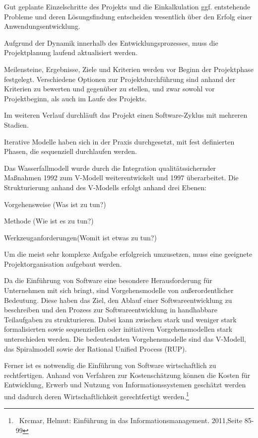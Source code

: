 \documentclass{article}
\begin{document}
Gut geplante Einzelschritte des Projekts und die Einkalkulation ggf. entstehende Probleme und deren Lösungsfindung
entscheiden wesentlich über den Erfolg einer Anwendungsentwicklung.

Aufgrund der Dynamik innerhalb des Entwicklungsprozesses, muss die Projektplanung laufend aktualisiert werden.

Meilensteine, Ergebnisse, Ziele und Kriterien werden vor Beginn der Projektphase festgelegt. Verschiedene Optionen zur
Projektdurchführung sind anhand der Kriterien zu bewerten und gegenüber zu stellen, und zwar sowohl vor Projektbeginn,
als auch im Laufe des Projekts.

Im weiteren Verlauf durchläuft das Projekt einen Software-Zyklus mit mehreren Stadien. 

Iterative Modelle haben sich in der Praxis durchgesetzt, mit fest definierten Phasen, die sequenziell durchlaufen
werden.

Das Wasserfallmodell wurde durch die Integration qualitätssichernder Maßnahmen 1992 zum V-Modell weiterentwickelt und
1997 überarbeitet. Die Strukturierung anhand des V-Modells erfolgt anhand drei Ebenen:

Vorgehensweise (Was ist zu tun?)

Methode (Wie ist es zu tun?)

Werkzeuganforderungen(Womit ist etwas zu tun?)


\bigskip

Um die meist sehr komplexe Aufgabe erfolgreich umzusetzen, muss eine geeignete Projektorganisation aufgebaut werden.


\bigskip

Da die Einführung von Software eine besondere Herausforderung für Unternehmen mit sich bringt, sind Vorgehensmodelle von
außerordentlicher Bedeutung. Diese haben das Ziel, den Ablauf einer Softwareentwicklung zu beschreiben und den Prozess
zur Softwareentwicklung in handhabbare Teilaufgaben zu strukturieren. Dabei kann zwischen stark und weniger stark
formalisierten sowie sequenziellen oder initiativen Vorgehensmodellen stark unterschieden werden. Die bedeutendsten
Vorgehensmodelle sind das V-Modell, das Spiralmodell sowie der Rational Unified Process (RUP).

Ferner ist es notwendig die Einführung von Software wirtschaftlich zu rechtfertigen. Anhand von Verfahren zur
Kostenschätzung können die Kosten für Entwicklung, Erwerb und Nutzung von Informationssystemen geschätzt werden und
dadurch deren Wirtschaftlichkeit gerechtfertigt werden.\footnote{\ Krcmar, Helmut: Einführung in das
Informationsmanagement. 2011,Seite 85-99}
\end{document}
